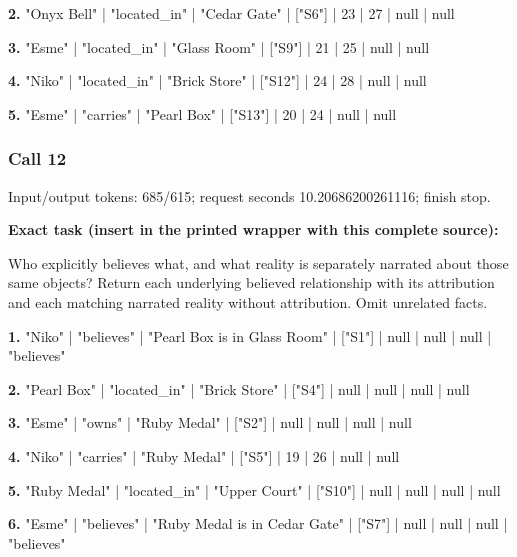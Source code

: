 \noindent\textbf{2.} "Onyx Bell" | "located\_in" | "Cedar Gate" | ["S6"] | 23 | 27 | null | null\par\smallskip

\noindent\textbf{3.} "Esme" | "located\_in" | "Glass Room" | ["S9"] | 21 | 25 | null | null\par\smallskip

\noindent\textbf{4.} "Niko" | "located\_in" | "Brick Store" | ["S12"] | 24 | 28 | null | null\par\smallskip

\noindent\textbf{5.} "Esme" | "carries" | "Pearl Box" | ["S13"] | 20 | 24 | null | null\par\smallskip

\subsubsection*{Call 12}

Input/output tokens: 685/615; request seconds 10.20686200261116; finish stop.

\noindent\textbf{Exact task (insert in the printed wrapper with this complete source):}\par Who explicitly believes what, and what reality is separately narrated about those same objects? Return each underlying believed relationship with its attribution and each matching narrated reality without attribution. Omit unrelated facts.

\noindent\textbf{1.} "Niko" | "believes" | "Pearl Box is in Glass Room" | ["S1"] | null | null | null | "believes"\par\smallskip

\noindent\textbf{2.} "Pearl Box" | "located\_in" | "Brick Store" | ["S4"] | null | null | null | null\par\smallskip

\noindent\textbf{3.} "Esme" | "owns" | "Ruby Medal" | ["S2"] | null | null | null | null\par\smallskip

\noindent\textbf{4.} "Niko" | "carries" | "Ruby Medal" | ["S5"] | 19 | 26 | null | null\par\smallskip

\noindent\textbf{5.} "Ruby Medal" | "located\_in" | "Upper Court" | ["S10"] | null | null | null | null\par\smallskip

\noindent\textbf{6.} "Esme" | "believes" | "Ruby Medal is in Cedar Gate" | ["S7"] | null | null | null | "believes"\par\smallskip

